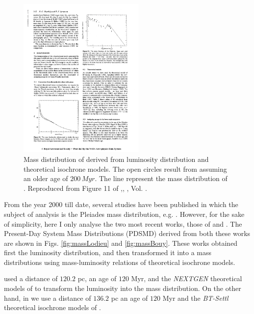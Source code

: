 \begin{figure}[ht!]
\begin{center}
\includegraphics[height=8cm]{background/Figures/F11_Hambly1991.pdf}
\caption{Mass distribution of \citet{Hambly1991} derived from luminosity distribution and theoretical isochrone models. The open circles result from assuming an older age of $200\,Myr$. The line represent the mass distribution of \citet{1980IAUS...85..157V}. Reproduced from Figure 11 of \citet{Hambly1991},\textit{}, , Vol. .}
\label{fig:massHambly}
\end{center}
\end{figure}

From the year 2000 till date, several studies have been published in which the subject of analysis is the Pleiades mass distribution, e.g. \citet{2000ASPC..198...59H, 2002MNRAS.335..853J, 2001A&A...367..211M,2003A&A...400..891M, 2004A&A...426...75M, 2007MNRAS.380..712L}. However, for the sake of simplicity, here I only analyse the two most recent works, those of \citet{Lodieu2012} and \citet{Bouy2015}. The Present-Day System Mass Distributions (PDSMD) derived from both these works are shown in Figs. \ref{fig:massLodieu} and \ref{fig:massBouy}. These works obtained first the luminosity distribution, and then transformed it into a mass distributions using mass-luminosity relations of theoretical isochrone models. 

\citet{Lodieu2012} used a distance of $120.2$ pc, an age of $120$ Myr, and the \emph{NEXTGEN} theoretical models of \citet{1998A&A...337..403B} to transform the luminosity into the mass distribution. On the other hand, in \citet{Bouy2015} we use a distance of $136.2$ pc an age of $120$ Myr and the \emph{BT-Settl} theoretical isochrone models of \citet{2014IAUS..299..271A}. 

